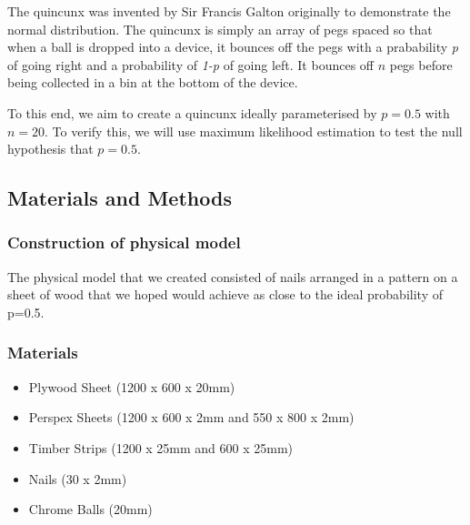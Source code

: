 The quincunx was invented by Sir Francis Galton originally to demonstrate the normal distribution. The quincunx is simply an array of pegs spaced so that when a ball is dropped into a device, it bounces off the pegs with a prabability \textit{p} of going right and a probability of \textit{1-p} of going left. It bounces off $n$ pegs before being collected in a bin at the bottom of the device.

To this end, we aim to create a quincunx ideally parameterised by $p=0.5$ with $n=20$. To verify this, we will use maximum likelihood estimation to test the null hypothesis that $p=0.5$.

\subsection{Materials and Methods}
\subsubsection*{Construction of physical model}
The physical model that we created consisted of nails arranged in a pattern on a sheet of wood that we hoped would achieve as close to the ideal probability of p=0.5.

\subsubsection*{Materials}
\begin{itemize}
    \item Plywood Sheet (1200 x 600 x 20mm)
\item Perspex Sheets (1200 x 600 x 2mm and 550 x 800 x 2mm)
\item Timber Strips (1200 x 25mm and 600 x 25mm)
\item Nails (30 x 2mm)
\item Chrome Balls (20mm)
\end{itemize}


